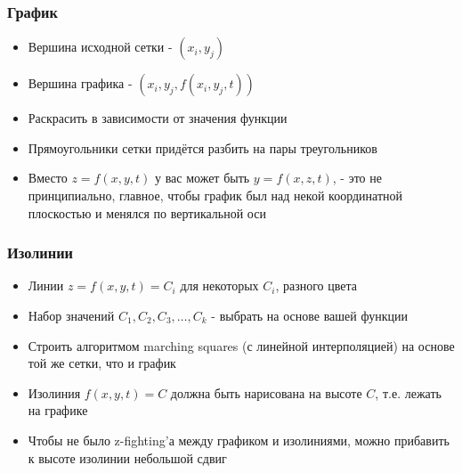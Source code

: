 \documentclass{beamer}
\begin{document}
\begin{frame}[fragile]
\frametitle{График}
\begin{itemize}
\item Вершина исходной сетки - \begin{math}(x_i, y_j)\end{math}
\item Вершина графика - \begin{math}(x_i, y_j, f(x_i, y_j, t))\end{math}
\item Раскрасить в зависимости от значения функции
\pause
\item Прямоугольники сетки придётся разбить на пары треугольников
\pause
\item Вместо \begin{math}z = f(x,y,t)\end{math} у вас может быть \begin{math}y = f(x,z,t)\end{math}, - это не принципиально, главное, чтобы график был над некой координатной плоскостью и менялся по вертикальной оси
\end{itemize}
\end{frame}

\begin{frame}[fragile]
\frametitle{Изолинии}
\begin{itemize}
\item Линии \begin{math}z = f(x,y,t) = C_i\end{math} для некоторых \begin{math}C_i\end{math}, разного цвета
\item Набор значений \begin{math}C_1, C_2, C_3, \dots, C_k\end{math} - выбрать на основе вашей функции
\pause
\item Строить алгоритмом marching squares (с линейной интерполяцией) на основе той же сетки, что и график
\item Изолиния \begin{math}f(x,y,t) = C\end{math} должна быть нарисована на высоте \begin{math}C\end{math}, т.е. лежать на графике
\pause
\item Чтобы не было z-fighting'а между графиком и изолиниями, можно прибавить к высоте изолинии небольшой сдвиг
\end{itemize}
\end{frame}
\end{document}
